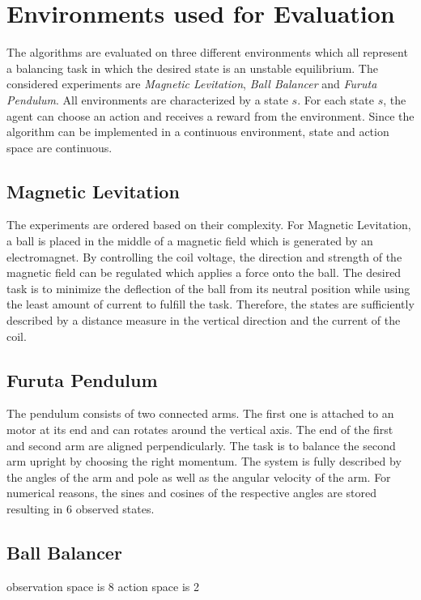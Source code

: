 \section{Environments used for Evaluation}
The algorithms are evaluated on three different environments which all represent a balancing task in which the desired state is an unstable equilibrium. The considered experiments are \textit{Magnetic Levitation}, \textit{Ball Balancer} and \textit{Furuta Pendulum}. All environments are characterized by a state $s$. For each state $s$, the agent can choose an action and receives a reward from the environment. Since the algorithm can be implemented in a continuous environment, state and action space are continuous.
\subsection{Magnetic Levitation}
The experiments are ordered based on their complexity. For Magnetic Levitation, a ball is placed in the middle of a magnetic field which is generated by an electromagnet. By controlling the coil voltage, the direction and strength of the magnetic field can be regulated which applies a force onto the ball. The desired task is to minimize the deflection of the ball from its neutral position while using the least amount of current to fulfill the task. Therefore, the states are sufficiently described by a distance measure in the vertical direction and the current of the coil.
\subsection{Furuta Pendulum}
The pendulum consists of two connected arms. The first one is attached to an motor at its end and can rotates around the vertical axis. The end of the first and second arm are aligned perpendicularly. The task is to balance the second arm upright by choosing the right momentum. The system is fully described by the angles of the arm and pole as well as the angular velocity of the arm. For numerical reasons, the sines and cosines of the respective angles are stored resulting in 6 observed states.	
\subsection{Ball Balancer}
observation space is 8 
action space is 2